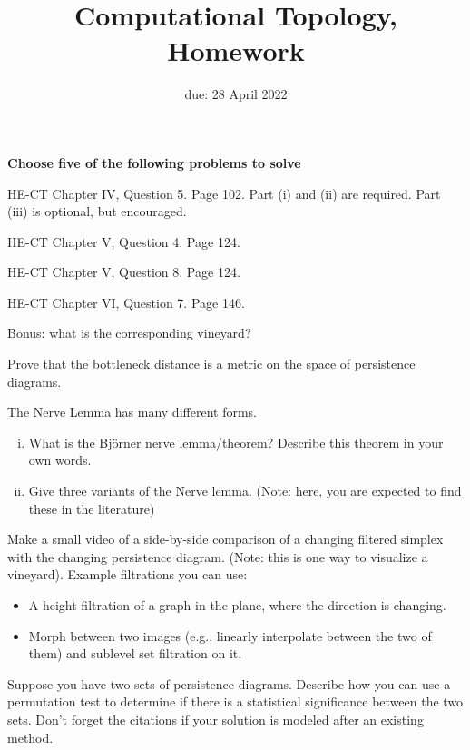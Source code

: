 \documentclass{article}
\title{Computational Topology, Homework \hwnum}
\author{\todo{your name here}}
\date{due: 28 April 2022}
\begin{document}
\maketitle



\textbf{Choose five of the following problems to solve}

HE-CT Chapter IV, Question 5. Page 102.  Part (i) and (ii) are required.  Part
(iii) is optional, but encouraged.


HE-CT Chapter V, Question 4. Page 124.

HE-CT Chapter V, Question 8. Page 124.

HE-CT Chapter VI, Question 7. Page 146.

Bonus: what is the corresponding vineyard?


Prove that the bottleneck distance is a metric on the space of persistence
diagrams.


The Nerve Lemma has many different forms.
\begin{enumerate}[(i)]
    \item What is the Bj\"orner nerve lemma/theorem?  Describe this theorem in
        your own words.
    \item Give three variants of the Nerve lemma.
        (Note: here, you are expected to find these in the literature)
\end{enumerate}


Make a small video of a side-by-side comparison of a changing filtered simplex
with the changing persistence diagram.  (Note: this is one way to visualize a
vineyard).  Example filtrations you can use:
\begin{itemize}
    \item A height filtration of a graph in the plane, where the direction is
        changing.
    \item Morph between two images (e.g., linearly interpolate between the two
        of them) and sublevel set filtration on it.
\end{itemize}


Suppose you have two sets of persistence diagrams.  Describe how you can use a
permutation test to determine if there is a statistical significance between the
two sets.  Don't forget the citations if your solution is modeled after an
existing method.
\end{document}
